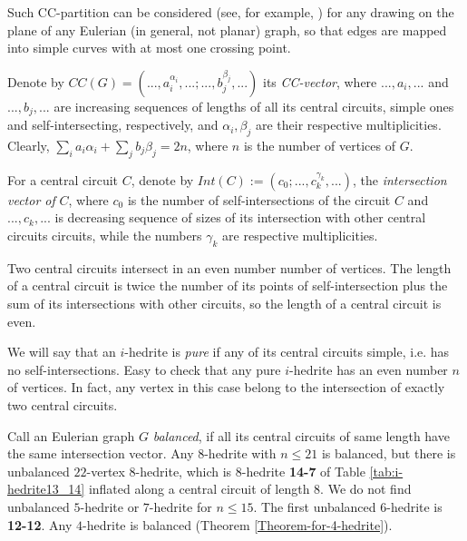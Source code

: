 \documentclass[12pt]{article}
\begin{document}
Such CC-partition can be considered (see, for example, \cite{Ha}) for any 
drawing on the plane of any Eulerian (in general, not planar) graph, so that 
edges are mapped into simple curves with at most one crossing point. 


Denote by 
$CC(G)=(...,a_i^{\alpha_i},...;...,b_j^{\beta_j},...)$ its {\it CC-vector}, 
where $...,a_i,...$ and  $...,b_j,...$ are increasing sequences of lengths of 
all its central circuits, simple ones and self-intersecting, respectively, 
and $\alpha_i, \beta_j$ are their respective multiplicities.
Clearly, $\sum_{i} a_i{\alpha_i}+ \sum_{j} b_j{\beta_j}=2n$, where 
$n$ is the number of vertices of $G$.

For a central circuit $C$, denote by $Int(C):=(c_0;...,c_k^{\gamma_k},...)$,
the {\em intersection vector of} $C$, where $c_0$ is
the number of self-intersections of the circuit $C$ and $...,c_k,...$ is
decreasing sequence of sizes of its intersection with other central circuits
circuits, while the numbers $\gamma_k$ are respective multiplicities.


Two central circuits intersect in an even number number of vertices. 
The length of a central circuit is twice the number of its points of 
self-intersection plus the sum of its intersections with other circuits, 
so the length of a central circuit is even.



We will say that an $i$-hedrite is {\it pure} if any of its central circuits 
simple, i.e. has no self-intersections.
Easy to check that any pure $i$-hedrite has an even number $n$ of 
vertices. In fact, any vertex in this case belong to the intersection 
of exactly two central circuits.


Call an Eulerian graph $G$ {\it balanced}, if all its central circuits of
same length have the same intersection vector.
Any $8$-hedrite with $n \le 21$ is balanced, but there is unbalanced
$22$-vertex $8$-hedrite, which is $8$-hedrite {\bf 14-7} of Table 
\ref{tab:i-hedrite13_14} inflated along a central circuit of length $8$.
We do not find unbalanced $5$-hedrite or $7$-hedrite for $n\leq 15$. The
first unbalanced $6$-hedrite is {\bf 12-12}. Any $4$-hedrite is balanced
(Theorem \ref{Theorem-for-4-hedrite}).
\end{document}
